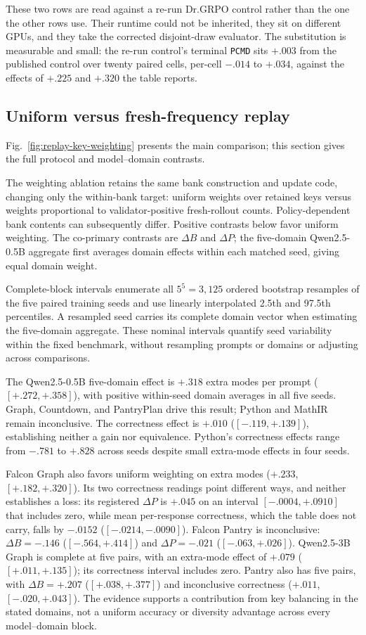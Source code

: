 \documentclass{article}
\newcommand{\1}{\mathbf 1}
\newcommand{\pmd}{\texttt{PCMD}}
\theoremstyle{remark}
\theoremstyle{definition}
\theoremstyle{plain}
\begin{document}
These two rows are read against a re-run Dr.GRPO control rather than the one
the other rows use. Their runtime could not be inherited, they sit on different
GPUs, and they take the corrected disjoint-draw evaluator. The substitution is
measurable and small: the re-run control's terminal \pmd{} sits $+.003$ from
the published control over twenty paired cells, per-cell $-.014$ to $+.034$,
against the effects of $+.225$ and $+.320$ the table reports.

\subsection{Uniform versus fresh-frequency replay}
\label{app:frequency-replay-progress}

Fig.~\ref{fig:replay-key-weighting} presents the main comparison; this section gives the full protocol and model--domain contrasts.

The weighting ablation retains the same bank construction and update code,
changing only the within-bank target: uniform weights over retained keys
versus weights proportional to validator-positive fresh-rollout counts.
Policy-dependent bank contents can subsequently differ. Positive contrasts
below favor uniform weighting. The co-primary contrasts are
$\Delta B$ and $\Delta P$; the five-domain Qwen2.5-0.5B aggregate first
averages domain effects within each matched seed, giving equal domain weight.

Complete-block intervals enumerate all $5^5=3{,}125$ ordered bootstrap
resamples of the five paired training seeds and use linearly interpolated
2.5th and 97.5th percentiles. A resampled seed carries its complete domain
vector when estimating the five-domain aggregate. These nominal intervals quantify seed
variability within the fixed benchmark, without resampling prompts or
domains or adjusting across comparisons.

The Qwen2.5-0.5B five-domain effect is $+.318$ extra modes per
prompt ($[+.272,+.358]$), with positive within-seed domain averages in all
five seeds. Graph, Countdown, and PantryPlan drive this result; Python and
MathIR remain inconclusive. The correctness effect is $+.010$
($[-.119,+.139]$), establishing neither a gain nor equivalence. Python's
correctness effects range from $-.781$ to $+.828$ across seeds despite
small extra-mode effects in four seeds.

Falcon Graph also favors uniform weighting on extra modes ($+.233$,
$[+.182,+.320]$). Its two correctness readings point different ways, and
neither establishes a loss: its registered $\Delta P$
is $+.045$ on an interval $[-.0004,+.0910]$ that
includes zero, while mean per-response correctness, which the table does not
carry, falls by $-.0152$ ($[-.0214,-.0090]$). Falcon Pantry is
inconclusive: $\Delta B=-.146$ ($[-.564,+.414]$) and $\Delta P=-.021$
($[-.063,+.026]$). Qwen2.5-3B Graph is complete at five pairs, with an extra-mode effect of
$+.079$ ($[+.011,+.135]$); its correctness interval includes zero.
Pantry also has five pairs, with $\Delta B=+.207$
($[+.038,+.377]$) and inconclusive correctness ($+.011$, $[-.020,+.043]$).
The evidence supports a contribution from key balancing in the stated domains, not a
uniform accuracy or diversity advantage across every model--domain block.
\end{document}
